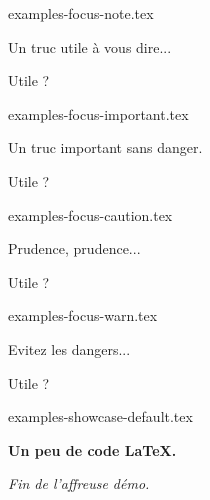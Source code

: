 \begin{filecontents*}{examples-focus-note.tex}
\begin{bdocnote}
    Un truc utile à vous dire...
\end{bdocnote}

\begin{bdocnote}
    Utile ?
\end{bdocnote}

\end{filecontents*}


\begin{filecontents*}{examples-focus-important.tex}
\begin{bdocimportant}
    Un truc important sans danger.
\end{bdocimportant}

\begin{bdocimportant}
    Utile ?
\end{bdocimportant}

\end{filecontents*}


\begin{filecontents*}{examples-focus-caution.tex}
\begin{bdoccaution}
    Prudence, prudence...
\end{bdoccaution}

\begin{bdoccaution}
    Utile ?
\end{bdoccaution}

\end{filecontents*}


\begin{filecontents*}{examples-focus-warn.tex}
\begin{bdocwarn}
    Evitez les dangers...
\end{bdocwarn}

\begin{bdocwarn}
    Utile ?
\end{bdocwarn}

\end{filecontents*}


\begin{filecontents*}{examples-showcase-default.tex}
\begin{bdocshowcase}
    \bfseries Un peu de code \LaTeX.

    \bigskip

    \emph{\large Fin de l'affreuse démo.}
\end{bdocshowcase}
\end{filecontents*}



